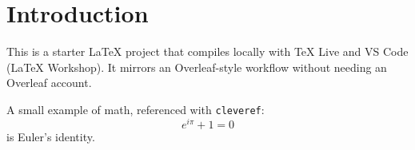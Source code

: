 \section{Introduction}
\label{sec:intro}

This is a starter LaTeX project that compiles locally with TeX Live and
VS Code (LaTeX Workshop). It mirrors an Overleaf-style workflow without
needing an Overleaf account.

A small example of math, referenced with \texttt{cleveref}:
\begin{equation}
  e^{i\pi} + 1 = 0
  \label{eq:euler}
\end{equation}
 is Euler's identity.
